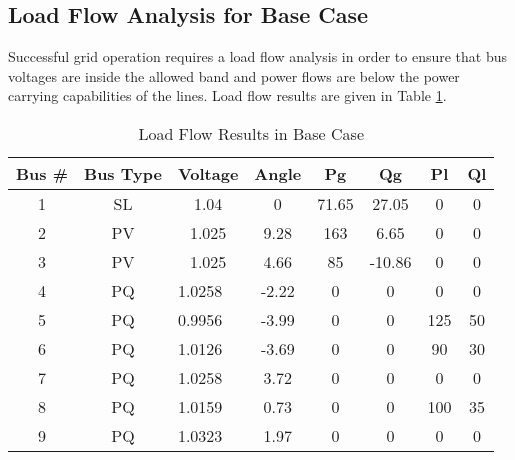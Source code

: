 \subsection{Load Flow Analysis for Base Case}
Successful grid operation requires a load flow analysis in order to ensure that bus voltages are inside the allowed band and power flows are below the power carrying capabilities of the lines. Load flow results are given in Table \ref{loadflow_case1}.
\begin{table}[h!]
	\centering
	\begin{tabular}{cclccccc}
		\hline
		Bus \# & Bus Type & \multicolumn{1}{c}{Voltage} & Angle & Pg    & Qg     & Pl  & Ql \\ \hline
		1      & SL       & \multicolumn{1}{c}{1.04}    & 0     & 71.65 & 27.05  & 0   & 0  \\
		2      & PV       & \multicolumn{1}{c}{1.025}   & 9.28  & 163   & 6.65   & 0   & 0  \\
		3      & PV       & \multicolumn{1}{c}{1.025}   & 4.66  & 85    & -10.86 & 0   & 0  \\
		4      & PQ       & 1.0258                      & -2.22 & 0     & 0      & 0   & 0  \\
		5      & PQ       & 0.9956                      & -3.99 & 0     & 0      & 125 & 50 \\
		6      & PQ       & 1.0126                      & -3.69 & 0     & 0      & 90  & 30 \\
		7      & PQ       & 1.0258                      & 3.72  & 0     & 0      & 0   & 0  \\
		8      & PQ       & 1.0159                      & 0.73  & 0     & 0      & 100 & 35 \\
		9      & PQ       & 1.0323                      & 1.97  & 0     & 0      & 0   & 0  \\ \hline
	\end{tabular}
	\caption{Load Flow Results in Base Case}
	\label{loadflow_case1}
\end{table}
